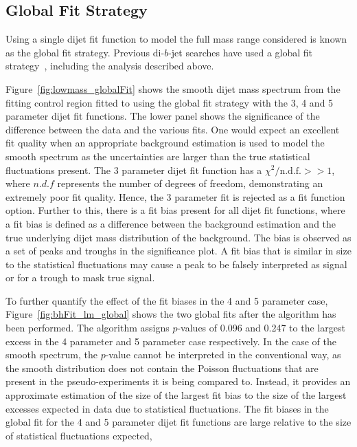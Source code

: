
\subsection{Global Fit Strategy}
\label{sec:bkg-full_globalFit}

Using a single dijet fit function to model the full mass range considered is known as the global fit strategy.
Previous di-$b$-jet searches have used a global fit strategy~\cite{dibjet-mori16_paper}, including the \summer{} analysis described above.


Figure~\ref{fig:lowmass_globalFit} shows the smooth dijet mass spectrum from the fitting control region
fitted to using the global fit strategy with the 3, 4 and 5 parameter dijet fit functions.
The lower panel shows the significance of the difference between the data and the various fits.
One would expect an excellent fit quality when an appropriate background estimation is used
to model the smooth spectrum as the uncertainties are larger than the true statistical fluctuations present.
The 3 parameter dijet fit function has a $\chi^{2}/\text{n.d.f.} >> 1$,
where $n.d.f$ represents the number of degrees of freedom, demonstrating an extremely poor fit quality.
Hence, the 3 parameter fit is rejected as a fit function option.
Further to this, there is a fit bias present for all dijet fit functions,
where a fit bias is defined as a difference between the background estimation and the true underlying dijet mass distribution of the background.
The bias is observed as a set of peaks and troughs in the significance plot.
A fit bias that is similar in size to the statistical fluctuations
may cause a peak to be falsely interpreted as signal or for a trough to mask true signal.

To further quantify the effect of the fit biases in the 4 and 5 parameter case,
Figure~\ref{fig:bhFit_lm_global} shows the two global fits after the \bh{} algorithm has been performed.
The \bh{} algorithm assigns \mbox{$p$-values} of 0.096 and 0.247 to the largest excess in the 4 parameter and 5 parameter case respectively.
In the case of the smooth spectrum, the \bh{} \mbox{$p$-value} cannot be interpreted in the conventional way,
as the smooth distribution does not contain the Poisson fluctuations that are present in the pseudo-experiments it is being compared to.
Instead, it provides an approximate estimation of the size of the largest fit bias to the size of the largest excesses expected in data due to statistical fluctuations.
The fit biases in the global fit for the 4 and 5 parameter dijet fit functions are large relative to the size of statistical fluctuations expected,


